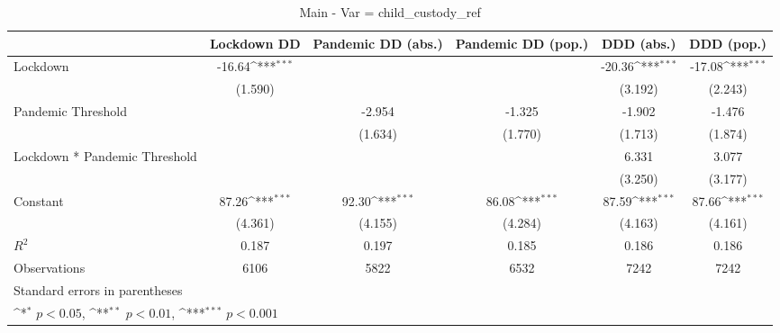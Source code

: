 \documentclass{article}
\begin{document}
{
\def\sym#1{\ifmmode^{#1}\else\(^{#1}\)\fi}
\begin{longtable}{l*{5}{c}}
\caption{Main - Var = child\_custody\_ref}\\
\hline\hline\endfirsthead\hline\endhead\hline\endfoot\endlastfoot
                &\multicolumn{1}{c}{Lockdown DD}&\multicolumn{1}{c}{Pandemic DD (abs.)}&\multicolumn{1}{c}{Pandemic DD (pop.)}&\multicolumn{1}{c}{DDD (abs.)}&\multicolumn{1}{c}{DDD (pop.)}\\
\hline
Lockdown        &   -16.64\sym{***}&                  &                  &   -20.36\sym{***}&   -17.08\sym{***}\\
                &  (1.590)         &                  &                  &  (3.192)         &  (2.243)         \\
Pandemic Threshold&                  &   -2.954         &   -1.325         &   -1.902         &   -1.476         \\
                &                  &  (1.634)         &  (1.770)         &  (1.713)         &  (1.874)         \\
Lockdown * Pandemic Threshold&                  &                  &                  &    6.331         &    3.077         \\
                &                  &                  &                  &  (3.250)         &  (3.177)         \\
Constant        &    87.26\sym{***}&    92.30\sym{***}&    86.08\sym{***}&    87.59\sym{***}&    87.66\sym{***}\\
                &  (4.361)         &  (4.155)         &  (4.284)         &  (4.163)         &  (4.161)         \\
\hline
\(R^{2}\)       &    0.187         &    0.197         &    0.185         &    0.186         &    0.186         \\
Observations    &     6106         &     5822         &     6532         &     7242         &     7242         \\
\hline\hline
\multicolumn{6}{l}{\footnotesize Standard errors in parentheses}\\
\multicolumn{6}{l}{\footnotesize \sym{*} \(p<0.05\), \sym{**} \(p<0.01\), \sym{***} \(p<0.001\)}\\
\end{longtable}
}
\end{document}
